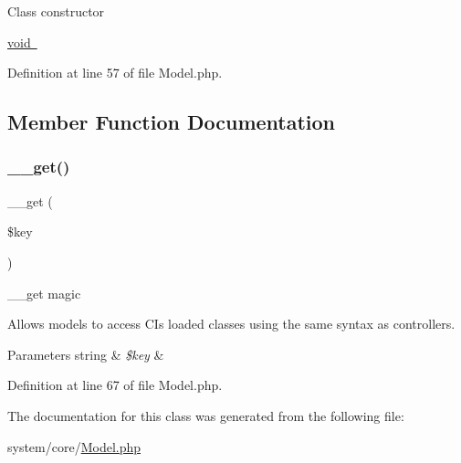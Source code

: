 Class constructor

\mbox{\hyperlink{}{void }}

Definition at line 57 of file Model.\+php.



\subsection{Member Function Documentation}
\mbox{\label{class_c_i___model_a4537dad3b44254124991341cc91b28fb}} 
\subsubsection{\texorpdfstring{\_\_get()}{\_\_get()}}
{\footnotesize\ttfamily \+\_\+\+\_\+get (\begin{DoxyParamCaption}\item[{}]{\$key }\end{DoxyParamCaption})}

\+\_\+\+\_\+get magic

Allows models to access CI\textquotesingle{}s loaded classes using the same syntax as controllers.


\begin{DoxyParams}[1]{Parameters}
string & {\em \$key} & \\
\hline
\end{DoxyParams}


Definition at line 67 of file Model.\+php.



The documentation for this class was generated from the following file\+:\begin{DoxyCompactItemize}
\item 
system/core/\mbox{\hyperlink{_model_8php}{Model.\+php}}\end{DoxyCompactItemize}
